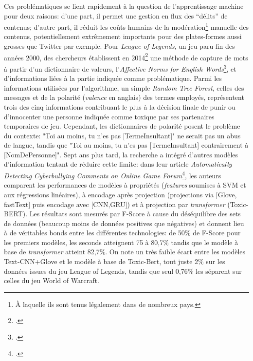Ces problématiques se lient rapidement à la question de l'apprentissage machine pour deux raisons: d'une part, il permet une gestion en flux des \enquote{délits} de contenus; d'autre part, il réduit les coûts humains de la modération\footnote{À laquelle ils sont tenus légalement dans de nombreux pays.} manuelle des contenus, potentiellement extrêmement importants pour des plates-formes aussi grosses que Twitter par exemple. Pour \textit{League of Legends}, un jeu paru fin des années 2000, des chercheurs établissent en 2014\footcite{blackburn_stfu_2014} une méthode de capture de mots à partir d'un dictionnaire de valeurs, l'\textit{Affective Norms for English Words}\footcite{bradley_affective_1999}, et d'informations liées à la partie indiquée comme problématique. Parmi les informations utilisées par l'algorithme, un simple \textit{Random Tree Forest}, celles des messages et de la polarité (\textit{valence} en anglais) des termes employés, représentent trois des cinq informations contribuant le plus à la décision finale de punir ou d'innocenter une personne indiquée comme toxique par ses partenaires temporaires de jeu. Cependant, les dictionnaires de polarité posent le problème du contexte: "Toi au moins, tu n'es pas [TermeInsultant]" ne serait pas un abus de langue, tandis que "Toi au moins, tu n'es pas [TermeInsultant] contrairement à [NomDePersonne]". Sept ans plus tard, la recherche a intégré d'autres modèles d'information tentant de réduire cette limite: dans leur article \textit{Automatically Detecting Cyberbullying Comments on Online Game Forum}\footcite{vo_automatically_2021}, les auteurs comparent les performances de modèles à propriétés (\textit{features} soumises à SVM et aux régressions linéaires), à encodage après projection (projections via [Glove, fastText] puis encodage avec [CNN,GRU]) et à projection par \textit{transformer} (Toxic-BERT). Les résultats sont mesurés par F-Score à cause du déséquilibre des sets de données (beaucoup moins de données positives que négatives) et donnent lieu à de véritables bonds entre les différentes technologies: de 50\% de F-Score pour les premiers modèles, les seconds atteignent 75 à 80,7\% tandis que le modèle à base de \textit{transformer} atteint 82,7\%. On note un très faible écart entre les modèles Text-CNN+Glove et le modèle à base de Toxic-Bert, tout juste 2\% sur les données issues du jeu League of Legends, tandis que seul 0,76\% les séparent sur celles du jeu World of Warcraft.

